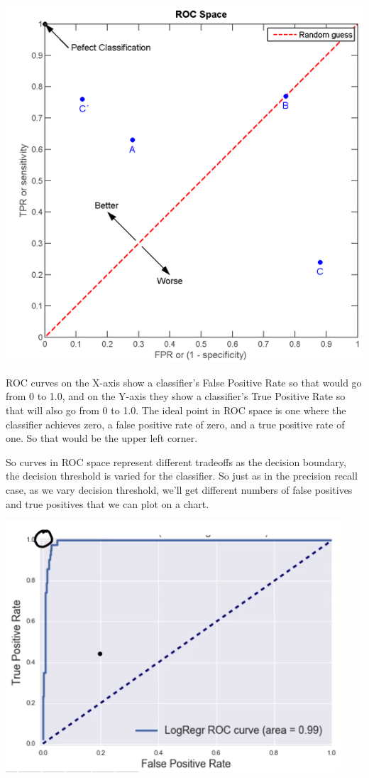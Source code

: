 \begin{multicols}{2}
\begin{center}
\includegraphics[width=\linewidth]{img/640px-ROC-space-2.png} 
\end{center}



ROC curves on the X-axis show a classifier's False Positive Rate so that would go from 0 to 1.0, and on the Y-axis they show a classifier's True Positive Rate so that will also go from 0 to 1.0. The ideal point in ROC space is one where the classifier achieves zero, a false positive rate of zero, and a true positive rate of one. So that would be the upper left corner. 

So curves in ROC space represent different tradeoffs as the decision boundary, the decision threshold is varied for the classifier. So just as in the precision recall case, as we vary decision threshold, we'll get different numbers of false positives and true positives that we can plot on a chart. 


\begin{center}
\includegraphics[width=\linewidth]{img/ROC-curve.png} 
\end{center}


\end{multicols}
